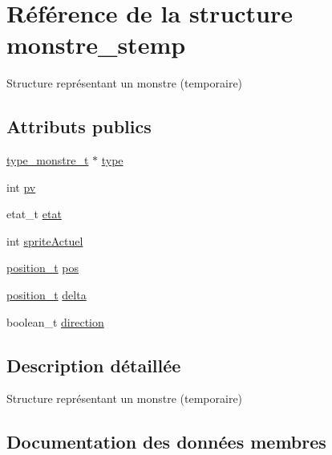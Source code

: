 \hypertarget{structmonstre__stemp}{}\section{Référence de la structure monstre\+\_\+stemp}
\label{structmonstre__stemp}


Structure représentant un monstre (temporaire)  


\subsection*{Attributs publics}
\begin{DoxyCompactItemize}
\item 
\hyperlink{structtype__monstre__s}{type\+\_\+monstre\+\_\+t} $\ast$ \hyperlink{structmonstre__stemp_a6f6979ed10551a56ffba65e75bf0ea32}{type}
\item 
int \hyperlink{structmonstre__stemp_a2a38c6df6274f86d3ef974ef0c37b5c1}{pv}
\item 
etat\+\_\+t \hyperlink{structmonstre__stemp_afccb029fd83b1f1bee514f4b9d57c75c}{etat}
\item 
int \hyperlink{structmonstre__stemp_a9df0eed055016b07d7c23407c1b39ecf}{sprite\+Actuel}
\item 
\hyperlink{structposition__s}{position\+\_\+t} \hyperlink{structmonstre__stemp_ac54692aa2c0b43403033f82b75c1f63a}{pos}
\item 
\hyperlink{structposition__s}{position\+\_\+t} \hyperlink{structmonstre__stemp_a160ccac69209691aad5a59ae583c3435}{delta}
\item 
boolean\+\_\+t \hyperlink{structmonstre__stemp_a66e083b29f2101e51efd2261ed45fcb4}{direction}
\end{DoxyCompactItemize}


\subsection{Description détaillée}
Structure représentant un monstre (temporaire) 

\subsection{Documentation des données membres}
\mbox{\label{structmonstre__stemp_a160ccac69209691aad5a59ae583c3435}} 
